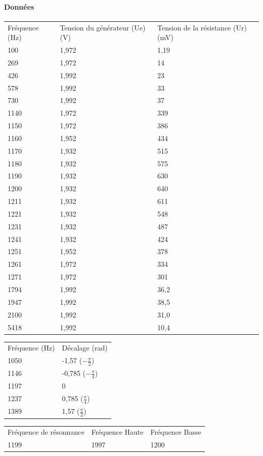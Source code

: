 \documentclass[a4paper,9pt,french]{scrartcl}
\begin{document}
\paragraph{Données}
\begin{center}
\begin{tabular}{lll}
Fréquence (Hz) & Tension du générateur (Ue) (V) & Tension de la résistance (Ur) (mV)\\
100 & 1,972 & 1,19\\
269 & 1,972 & 14\\
426 & 1,992 & 23\\
578 & 1,992 & 33\\
730 & 1,992 & 37\\
1140 & 1,972 & 339\\
1150 & 1,972 & 386\\
1160 & 1,952 & 434\\
1170 & 1,932 & 515\\
1180 & 1,932 & 575\\
1190 & 1,932 & 630\\
1200 & 1,932 & 640\\
1211 & 1,932 & 611\\
1221 & 1,932 & 548\\
1231 & 1,932 & 487\\
1241 & 1,932 & 424\\
1251 & 1,952 & 378\\
1261 & 1,972 & 334\\
1271 & 1,972 & 301\\
1794 & 1,992 & 36,2\\
1947 & 1,992 & 38,5\\
2100 & 1,992 & 31,0\\
5418 & 1,992 & 10,4
\end{tabular}
\end{center}
\begin{center}
\begin{tabular}{ll}
Fréquence (Hz) & Décalage (rad)\\
1050 & -1,57 (\(-\frac{\pi}{2}\))\\
1146 & -0,785 (\(-\frac{\pi}{4}\))\\
1197 & 0\\
1237 & 0,785 (\(\frac{\pi}{4}\))\\
1389 & 1,57 (\(\frac{\pi}{2}\))
\end{tabular}
\end{center}
\begin{center}
\begin{tabular}{lll}
Fréquence de résonnance & Fréquence Haute & Fréquence Basse\\
1199 & 1997 & 1200
\end{tabular}
\end{center}
\end{document}
